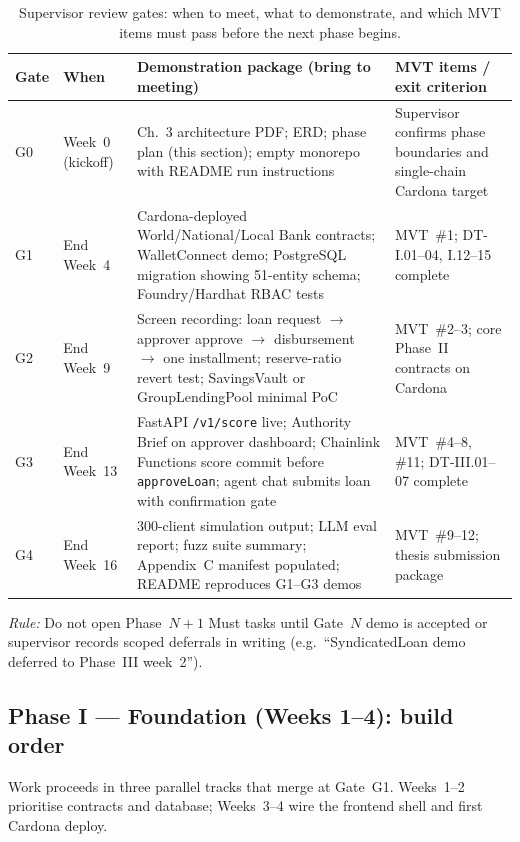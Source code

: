 \documentclass[12pt,a4paper]{report}
\newcommand{\tableheadcolor}{\rowcolor{TableHeadBg}}
\begin{document}
\begin{table}[H]
\centering
\caption[Supervisor review gates]{Supervisor review gates: when to meet, what to demonstrate, and which MVT items must pass before the next phase begins.}
\label{tab:supervisor-gates}
\small
\begin{tabular}{p{1.4cm}p{2.2cm}p{4.8cm}p{5.8cm}}
\toprule
\tableheadcolor
\textbf{Gate} & \textbf{When} & \textbf{Demonstration package (bring to meeting)} & \textbf{MVT items / exit criterion} \\
\midrule
G0 & Week~0 (kickoff) & Ch.~3 architecture PDF; ERD; phase plan (this section); empty monorepo with README run instructions & Supervisor confirms phase boundaries and single-chain Cardona target \\
G1 & End Week~4 & Cardona-deployed World/National/Local Bank contracts; WalletConnect demo; PostgreSQL migration showing 51-entity schema; Foundry/Hardhat RBAC tests & MVT~\#1; DT-I.01--04, I.12--15 complete \\
G2 & End Week~9 & Screen recording: loan request $\to$ approver approve $\to$ disbursement $\to$ one installment; reserve-ratio revert test; SavingsVault or GroupLendingPool minimal PoC & MVT~\#2--3; core Phase~II contracts on Cardona \\
G3 & End Week~13 & FastAPI \texttt{/v1/score} live; Authority Brief on approver dashboard; Chainlink Functions score commit before \texttt{approveLoan}; agent chat submits loan with confirmation gate & MVT~\#4--8, \#11; DT-III.01--07 complete \\
G4 & End Week~16 & 300-client simulation output; LLM eval report; fuzz suite summary; Appendix~C manifest populated; README reproduces G1--G3 demos & MVT~\#9--12; thesis submission package \\
\bottomrule
\end{tabular}
\end{table}

\noindent\textit{Rule:} Do not open Phase~$N{+}1$ Must tasks until Gate~$N$ demo is accepted or supervisor records scoped deferrals in writing (e.g.\ ``SyndicatedLoan demo deferred to Phase~III week~2'').

\subsection{Phase I --- Foundation (Weeks 1--4): build order}

Work proceeds in three parallel tracks that merge at Gate~G1. Weeks~1--2 prioritise contracts and database; Weeks~3--4 wire the frontend shell and first Cardona deploy.
\end{document}
